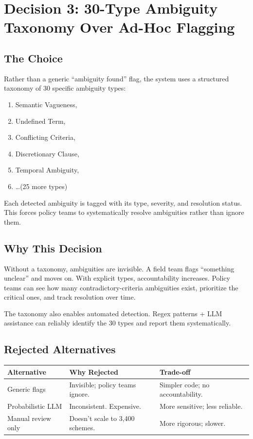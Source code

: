 \documentclass[11pt,a4paper]{report}
\begin{document}
\section{Decision 3: 30-Type Ambiguity Taxonomy Over Ad-Hoc Flagging}

\subsection{The Choice}

Rather than a generic ``ambiguity found'' flag, the system uses a structured taxonomy of 30 specific ambiguity types:

\small
\begin{enumerate}
  \item Semantic Vagueness, 
  \item Undefined Term, 
  \item Conflicting Criteria, 
  \item Discretionary Clause, 
  \item Temporal Ambiguity, 
  \item \ldots (25 more types)
\end{enumerate}
\normalsize

Each detected ambiguity is tagged with its type, severity, and resolution status. This forces policy teams to systematically resolve ambiguities rather than ignore them.

\subsection{Why This Decision}

Without a taxonomy, ambiguities are invisible. A field team flags ``something unclear'' and moves on. With explicit types, accountability increases. Policy teams can see how many contradictory-criteria ambiguities exist, prioritize the critical ones, and track resolution over time.

The taxonomy also enables automated detection. Regex patterns + LLM assistance can reliably identify the 30 types and report them systematically.

\subsection{Rejected Alternatives}

\begin{table}[H]
\centering
\small
\begin{tabular}{p{2cm}p{4cm}p{3cm}}
\toprule
Alternative & Why Rejected & Trade-off \\
\midrule
Generic flags & Invisible; policy teams ignore. & Simpler code; no accountability. \\
Probabilistic LLM & Inconsistent. Expensive. & More sensitive; less reliable. \\
Manual review only & Doesn't scale to 3,400 schemes. & More rigorous; slower. \\
\bottomrule
\end{tabular}
\end{table}
\end{document}
